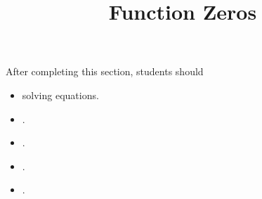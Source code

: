\documentclass{ximera}
\title{Function Zeros}
\begin{document}
\begin{abstract}
\end{abstract}
\maketitle

\begin{sectionOutcomes}
After completing this section, students should 

\begin{itemize}
\item solving equations.
\item .
\item .
\item .
\item .
\end{itemize}
\end{sectionOutcomes}
\end{document}
